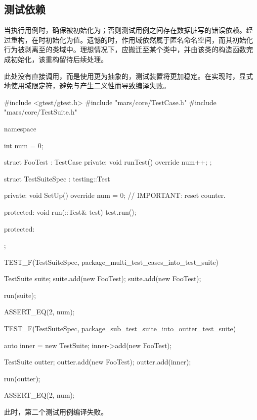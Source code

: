 \begin{content}
\subsection{测试依赖}

当执行用例时，确保被初始化为；否则测试用例之间存在数据脏写的错误依赖。经过重构，在时初始化为值。遗憾的时，作用域依然属于匿名命名空间，而其初始化行为被剥离至的类域中。理想情况下，应搬迁至某个类中，并由该类的构造函数完成初始化，该重构留待后续处理。

此处没有直接调用，而是使用更为抽象的，测试装置将更加稳定。在实现时，显式地使用域限定符，避免与产生二义性而导致编译失败。

\begin{leftbar}
 \begin{c++}[caption={\ttfamily{test/mars/core/TestSuiteSpec.cc}}]
#include <gtest/gtest.h>
#include "mars/core/TestCase.h"
#include "mars/core/TestSuite.h"

namespace {
  int num = 0;

  struct FooTest : TestCase {
  private:
    void runTest() override {
      num++;
    }
  };

  struct TestSuiteSpec : testing::Test {
  private:
    void SetUp() override {
      num = 0;  // IMPORTANT: reset counter.
    }

  protected:
    void run(::Test& test) {
      test.run();
    }

  protected:
  };
}

TEST_F(TestSuiteSpec, package_multi_test_cases_into_test_suite) {
  TestSuite suite;
  suite.add(new FooTest);
  suite.add(new FooTest);

  run(suite);

  ASSERT_EQ(2, num);
}

TEST_F(TestSuiteSpec, package_sub_test_suite_into_outter_test_suite) {
  auto inner = new TestSuite;
  inner->add(new FooTest);

  TestSuite outter;
  outter.add(new FooTest);
  outter.add(inner);

  run(outter);

  ASSERT_EQ(2, num);
}
 \end{c++}
\end{leftbar}

此时，第二个测试用例编译失败。

\begin{story}
  \begin{center}
  \end{center}


\end{story}
\end{content}
